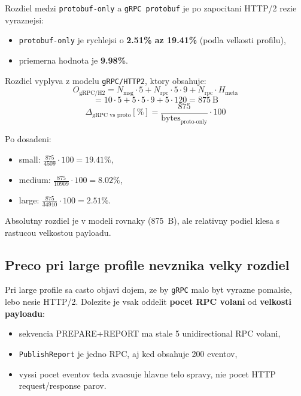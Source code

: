 \documentclass[12pt,a4paper]{report}
\begin{document}
Rozdiel medzi \texttt{protobuf-only} a \texttt{gRPC protobuf} je po zapocitani
HTTP/2 rezie vyraznejsi:
\begin{itemize}
  \item \texttt{protobuf-only} je rychlejsi o \textbf{2.51\% az 19.41\%}
  (podla velkosti profilu),
  \item priemerna hodnota je \textbf{9.98\%}.
\end{itemize}

Rozdiel vyplyva z modelu \texttt{gRPC/HTTP2}, ktory obsahuje:
\begin{equation}
O_{\text{gRPC/H2}} =
N_{\text{msg}}\cdot5 +
N_{\text{rpc}}\cdot5\cdot9 +
N_{\text{rpc}}\cdot H_{\text{meta}}
\end{equation}
\begin{equation}
= 10\cdot5 + 5\cdot5\cdot9 + 5\cdot120 = 875~\text{B}
\end{equation}
\begin{equation}
\Delta_{\text{gRPC vs proto}} [\%] =
\frac{875}{\text{bytes}_{\text{proto-only}}}\cdot 100
\end{equation}

Po dosadeni:
\begin{itemize}
  \item small: $\frac{875}{4509}\cdot100 = 19.41\%$,
  \item medium: $\frac{875}{10909}\cdot100 = 8.02\%$,
  \item large: $\frac{875}{34910}\cdot100 = 2.51\%$.
\end{itemize}

Absolutny rozdiel je v modeli rovnaky (875~B), ale relativny podiel klesa
s rastucou velkostou payloadu.

\subsection{Preco pri large profile nevznika velky rozdiel}

Pri large profile sa casto objavi dojem, ze by \texttt{gRPC} malo byt
vyrazne pomalsie, lebo nesie HTTP/2. Dolezite je vsak oddelit
\textbf{pocet RPC volani} od \textbf{velkosti payloadu}:
\begin{itemize}
  \item sekvencia PREPARE+REPORT ma stale 5 unidirectional RPC volani,
  \item \texttt{PublishReport} je jedno RPC, aj ked obsahuje 200 eventov,
  \item vyssi pocet eventov teda zvacsuje hlavne telo spravy, nie pocet
  HTTP request/response parov.
\end{itemize}
\end{document}
